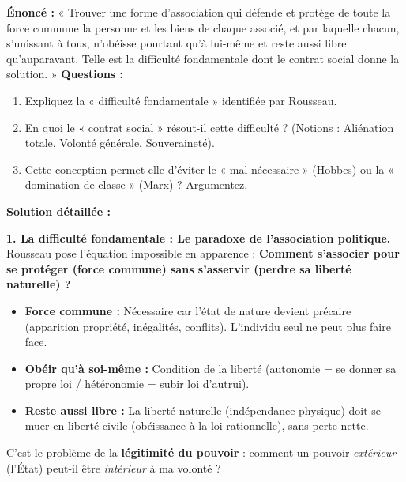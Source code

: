 \documentclass[11pt]{article}
\begin{document}
\begin{exoresolu}
\textbf{Énoncé :} « Trouver une forme d'association qui défende et protège de toute la force commune la personne et les biens de chaque associé, et par laquelle chacun, s'unissant à tous, n'obéisse pourtant qu'à lui-même et reste aussi libre qu'auparavant. Telle est la difficulté fondamentale dont le contrat social donne la solution. »
\textbf{Questions :}
\begin{enumerate}
    \item Expliquez la « difficulté fondamentale » identifiée par Rousseau.
    \item En quoi le « contrat social » résout-il cette difficulté ? (Notions : Aliénation totale, Volonté générale, Souveraineté).
    \item Cette conception permet-elle d'éviter le « mal nécessaire » (Hobbes) ou la « domination de classe » (Marx) ? Argumentez.
\end{enumerate}
\tcblower
\textbf{Solution détaillée :}

\textbf{1. La difficulté fondamentale : Le paradoxe de l'association politique.}
Rousseau pose l'équation impossible en apparence : \textbf{Comment s'associer pour se protéger (force commune) sans s'asservir (perdre sa liberté naturelle) ?}
\begin{itemize}
    \item \textbf{Force commune :} Nécessaire car l'état de nature devient précaire (apparition propriété, inégalités, conflits). L'individu seul ne peut plus faire face.
    \item \textbf{Obéir qu'à soi-même :} Condition de la liberté (autonomie = se donner sa propre loi / hétéronomie = subir loi d'autrui).
    \item \textbf{Reste aussi libre :} La liberté naturelle (indépendance physique) doit se muer en liberté civile (obéissance à la loi rationnelle), sans perte nette.
\end{itemize}
C'est le problème de la \textbf{légitimité du pouvoir} : comment un pouvoir \emph{extérieur} (l'État) peut-il être \emph{intérieur} à ma volonté ?


\end{exoresolu}
\end{document}
